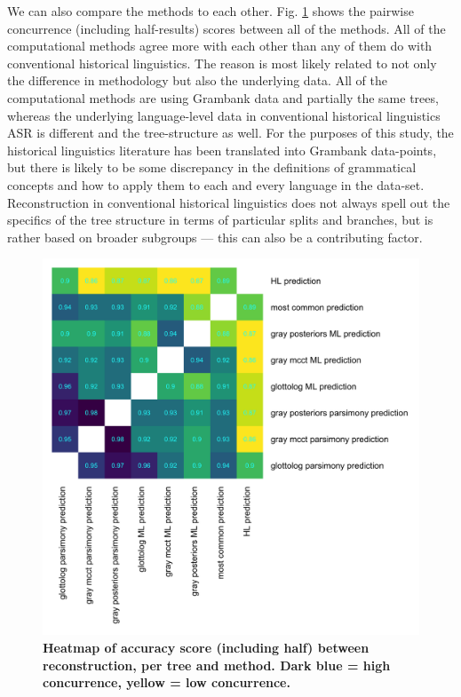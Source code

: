 \documentclass[12pt,letterpaper]{article}
\begin{document}
We can also compare the methods to each other. Fig. \ref{heatmap_accuracy_score_methods} shows the pairwise concurrence (including half-results) scores between all of the methods. All of the computational methods agree more with each other than any of them do with conventional historical linguistics. The reason is most likely related to not only the difference in methodology but also the underlying data. All of the computational methods are using Grambank data and partially the same trees, whereas the underlying language-level data in conventional historical linguistics ASR is different and the tree-structure as well. For the purposes of this study, the historical linguistics literature has been translated into Grambank data-points, but there is likely to be some discrepancy in the definitions of grammatical concepts and how to apply them to each and every language in the data-set. Reconstruction in conventional historical linguistics does not always spell out the specifics of the tree structure in terms of particular splits and branches, but is rather based on broader subgroups --- this can also be a contributing factor.


\begin{figure}[ht]
\centering
\includegraphics[width=17cm]{illustrations/plots_from_R/results/dist_heatmap_all_methods.png}
\caption{\textbf{Heatmap of accuracy score (including half) between reconstruction, per tree and method. Dark blue = high concurrence, yellow = low concurrence.}}
\label{heatmap_accuracy_score_methods}
\end{figure}
\end{document}
